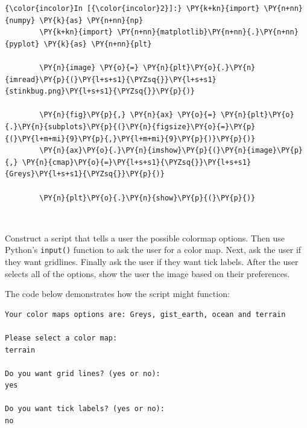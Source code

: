 \documentclass[11pt]{article}
\begin{document}
    \begin{Verbatim}[commandchars=\\\{\}]
{\color{incolor}In [{\color{incolor}2}]:} \PY{k+kn}{import} \PY{n+nn}{numpy} \PY{k}{as} \PY{n+nn}{np}
        \PY{k+kn}{import} \PY{n+nn}{matplotlib}\PY{n+nn}{.}\PY{n+nn}{pyplot} \PY{k}{as} \PY{n+nn}{plt}
        
        \PY{n}{image} \PY{o}{=} \PY{n}{plt}\PY{o}{.}\PY{n}{imread}\PY{p}{(}\PY{l+s+s1}{\PYZsq{}}\PY{l+s+s1}{stinkbug.png}\PY{l+s+s1}{\PYZsq{}}\PY{p}{)}
        
        \PY{n}{fig}\PY{p}{,} \PY{n}{ax} \PY{o}{=} \PY{n}{plt}\PY{o}{.}\PY{n}{subplots}\PY{p}{(}\PY{n}{figsize}\PY{o}{=}\PY{p}{(}\PY{l+m+mi}{9}\PY{p}{,}\PY{l+m+mi}{9}\PY{p}{)}\PY{p}{)}
        \PY{n}{ax}\PY{o}{.}\PY{n}{imshow}\PY{p}{(}\PY{n}{image}\PY{p}{,} \PY{n}{cmap}\PY{o}{=}\PY{l+s+s1}{\PYZsq{}}\PY{l+s+s1}{Greys}\PY{l+s+s1}{\PYZsq{}}\PY{p}{)}
        
        \PY{n}{plt}\PY{o}{.}\PY{n}{show}\PY{p}{(}\PY{p}{)}
\end{Verbatim}


    \begin{center}
    \end{center}
    { \hspace*{\fill} \\}
    
    Construct a script that tells a user the possible colormap options. Then
use Python's \texttt{input()} function to ask the user for a color map.
Next, ask the user if they want gridlines. Finally ask the user if they
want tick labels. After the user selects all of the options, show the
user the image based on their preferences.

The code below demonstrates how the script might function:

\begin{verbatim}
Your color maps options are: Greys, gist_earth, ocean and terrain

Please select a color map:
terrain

Do you want grid lines? (yes or no):
yes

Do you want tick labels? (yes or no):
no
\end{verbatim}
\end{document}
